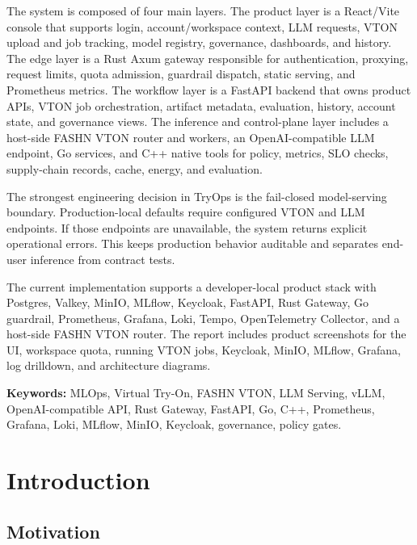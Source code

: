 \documentclass[12pt,a4paper,oneside]{report}
\begin{document}
The system is composed of four main layers. The product layer is a React/Vite console that supports login, account/workspace context, LLM requests, VTON upload and job tracking, model registry, governance, dashboards, and history. The edge layer is a Rust Axum gateway responsible for authentication, proxying, request limits, quota admission, guardrail dispatch, static serving, and Prometheus metrics. The workflow layer is a FastAPI backend that owns product APIs, VTON job orchestration, artifact metadata, evaluation, history, account state, and governance views. The inference and control-plane layer includes a host-side FASHN VTON router and workers, an OpenAI-compatible LLM endpoint, Go services, and C++ native tools for policy, metrics, SLO checks, supply-chain records, cache, energy, and evaluation.

The strongest engineering decision in TryOps is the fail-closed model-serving boundary. Production-local defaults require configured VTON and LLM endpoints. If those endpoints are unavailable, the system returns explicit operational errors. This keeps production behavior auditable and separates end-user inference from contract tests.

The current implementation supports a developer-local product stack with Postgres, Valkey, MinIO, MLflow, Keycloak, FastAPI, Rust Gateway, Go guardrail, Prometheus, Grafana, Loki, Tempo, OpenTelemetry Collector, and a host-side FASHN VTON router. The report includes product screenshots for the UI, workspace quota, running VTON jobs, Keycloak, MinIO, MLflow, Grafana, log drilldown, and architecture diagrams.

\textbf{Keywords:} MLOps, Virtual Try-On, FASHN VTON, LLM Serving, vLLM, OpenAI-compatible API, Rust Gateway, FastAPI, Go, C++, Prometheus, Grafana, Loki, MLflow, MinIO, Keycloak, governance, policy gates.

\tableofcontents
\listoffigures
\clearpage
{}

\chapter{Introduction}

\section{Motivation}
\end{document}
